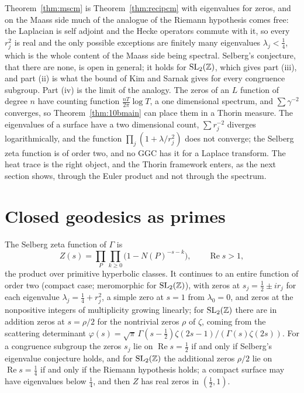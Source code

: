 Theorem~\ref{thm:mscm} is Theorem~\ref{thm:recipcm} with eigenvalues for zeros, and on the Maass side much of the analogue of the Riemann hypothesis comes free: the Laplacian is self adjoint and the Hecke operators commute with it, so every $r_j^2$ is real and the only possible exceptions are finitely many eigenvalues $\lambda_j<\frac14$, which is the whole content of the Maass side being spectral. Selberg's conjecture, that there are none, is open in general; it holds for $\mathrm{SL}_2(\mathbb{Z})$, which gives part (iii), and part (ii) is what the bound of Kim and Sarnak gives for every congruence subgroup. Part (iv) is the limit of the analogy. The zeros of an $L$ function of degree $n$ have counting function $\frac{nT}{2\pi}\log T$, a one dimensional spectrum, and $\sum\gamma^{-2}$ converges, so Theorem~\ref{thm:10bmain} can place them in a Thorin measure. The eigenvalues of a surface have a two dimensional count, $\sum r_j^{-2}$ diverges logarithmically, and the function $\prod_j(1+\lambda/r_j^2)$ does not converge; the Selberg zeta function is of order two, and no GGC has it for a Laplace transform. The heat trace is the right object, and the Thorin framework enters, as the next section shows, through the Euler product and not through the spectrum.

\section{Closed geodesics as primes}\label{sec:msgeodesics}

The Selberg zeta function of $\Gamma$ is
\[
Z(s)=\prod_P\prod_{k\ge0}\bigl(1-N(P)^{-s-k}\bigr),\qquad\operatorname{Re}s>1,
\]
the product over primitive hyperbolic classes. It continues to an entire function of order two (compact case; meromorphic for $\mathrm{SL}_2(\mathbb{Z})$), with zeros at $s_j=\frac12\pm ir_j$ for each eigenvalue $\lambda_j=\frac14+r_j^2$, a simple zero at $s=1$ from $\lambda_0=0$, and zeros at the nonpositive integers of multiplicity growing linearly; for $\mathrm{SL}_2(\mathbb{Z})$ there are in addition zeros at $s=\rho/2$ for the nontrivial zeros $\rho$ of $\zeta$, coming from the scattering determinant $\varphi(s)=\sqrt\pi\,\Gamma(s-\frac12)\zeta(2s-1)/(\Gamma(s)\zeta(2s))$. For a congruence subgroup the zeros $s_j$ lie on $\operatorname{Re}s=\frac12$ if and only if Selberg's eigenvalue conjecture holds, and for $\mathrm{SL}_2(\mathbb{Z})$ the additional zeros $\rho/2$ lie on $\operatorname{Re}s=\frac14$ if and only if the Riemann hypothesis holds; a compact surface may have eigenvalues below $\frac14$, and then $Z$ has real zeros in $(\frac12,1)$.

